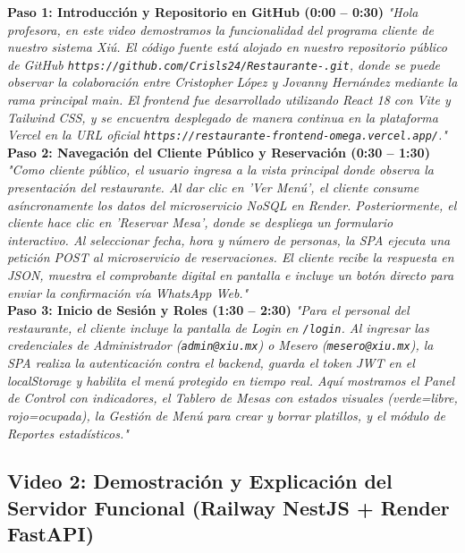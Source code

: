 \documentclass[12pt,a4paper]{article}
\begin{document}
\begin{tcolorbox}[title=Guión Explicativo para el Video del CLIENTE (Paso a Paso)]
\textbf{Paso 1: Introducción y Repositorio en GitHub (0:00 -- 0:30)}\newline
\textit{"Hola profesora, en este video demostramos la funcionalidad del programa cliente de nuestro sistema Xiú. El código fuente está alojado en nuestro repositorio público de GitHub \texttt{https://github.com/Crisls24/Restaurante-.git}, donde se puede observar la colaboración entre Cristopher López y Jovanny Hernández mediante la rama principal main. El frontend fue desarrollado utilizando React 18 con Vite y Tailwind CSS, y se encuentra desplegado de manera continua en la plataforma Vercel en la URL oficial \texttt{https://restaurante-frontend-omega.vercel.app/}."}\\[8pt]

\textbf{Paso 2: Navegación del Cliente Público y Reservación (0:30 -- 1:30)}\newline
\textit{"Como cliente público, el usuario ingresa a la vista principal donde observa la presentación del restaurante. Al dar clic en 'Ver Menú', el cliente consume asíncronamente los datos del microservicio NoSQL en Render. Posteriormente, el cliente hace clic en 'Reservar Mesa', donde se despliega un formulario interactivo. Al seleccionar fecha, hora y número de personas, la SPA ejecuta una petición POST al microservicio de reservaciones. El cliente recibe la respuesta en JSON, muestra el comprobante digital en pantalla e incluye un botón directo para enviar la confirmación vía WhatsApp Web."}\\[8pt]

\textbf{Paso 3: Inicio de Sesión y Roles (1:30 -- 2:30)}\newline
\textit{"Para el personal del restaurante, el cliente incluye la pantalla de Login en \texttt{/login}. Al ingresar las credenciales de Administrador (\texttt{admin@xiu.mx}) o Mesero (\texttt{mesero@xiu.mx}), la SPA realiza la autenticación contra el backend, guarda el token JWT en el localStorage y habilita el menú protegido en tiempo real. Aquí mostramos el Panel de Control con indicadores, el Tablero de Mesas con estados visuales (verde=libre, rojo=ocupada), la Gestión de Menú para crear y borrar platillos, y el módulo de Reportes estadísticos."}
\end{tcolorbox}

\subsection{Video 2: Demostración y Explicación del Servidor Funcional (Railway NestJS + Render FastAPI)}
\end{document}
